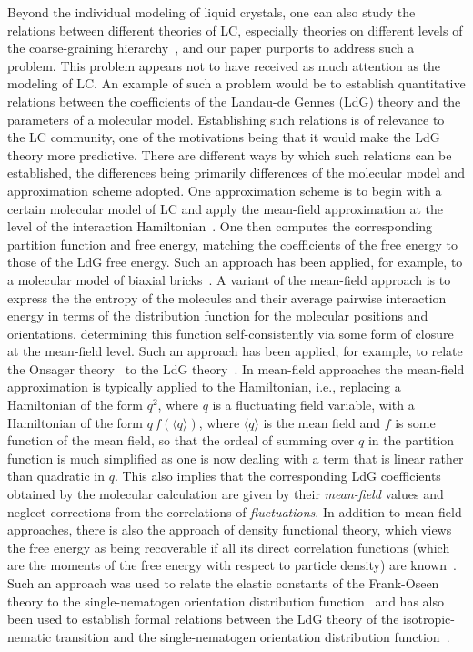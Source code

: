 \documentclass[jcp,aps,twocolumn,showpacs,supergroupedaddress,epsfig,amsmath,amssymb,eqsecnum]{revtex4}
\begin{document}
Beyond the individual modeling of liquid crystals, one can also study the relations between different theories of LC, especially theories on different levels of the coarse-graining hierarchy~\cite{chandrasekhar,han2015,sauerwein-oliveira2016}, and our paper purports to address such a problem. This problem appears not to have received as much attention as the modeling of LC. An example of such a problem would be to establish quantitative relations between the coefficients of the Landau-de Gennes (LdG) theory and the parameters of a molecular model. Establishing such relations is of relevance to the LC community, one of the motivations being that it would make the LdG theory more predictive. There are different ways by which such relations can be established, the differences being primarily differences of the molecular model and approximation scheme adopted. One approximation scheme is to begin with a certain molecular model of LC and apply the mean-field approximation at the level of the interaction Hamiltonian~\cite{chandrasekhar}. One then computes the corresponding partition function and free energy, matching the coefficients of the free energy to those of the LdG free energy. Such an approach has been applied, for example, to a molecular model of biaxial bricks~\cite{sauerwein-oliveira2016}. A variant of the mean-field approach is to express the the entropy of the molecules and their average pairwise interaction energy in terms of the distribution function for the molecular positions and orientations, determining this function self-consistently via some form of closure at the mean-field level. Such an approach has been applied, for example, to relate the Onsager theory~\cite{onsager1949} to the LdG theory~\cite{han2015}. In mean-field approaches the mean-field approximation is typically applied to the Hamiltonian, i.e., replacing a Hamiltonian of the form $q^2$, where $q$ is a fluctuating field variable, with a Hamiltonian of the form $q \, f(\langle q \rangle)$, where $\langle q \rangle$ is the mean field and $f$ is some function of the mean field, so that the ordeal of summing over $q$ in the partition function is much simplified as one is now dealing with a term that is linear rather than quadratic in $q$. This also implies that the corresponding LdG coefficients obtained by the molecular calculation are given by their {\em mean-field} values and neglect corrections from the correlations of {\em fluctuations}. In addition to mean-field approaches, there is also the approach of density functional theory, which views the free energy as being recoverable if all its direct correlation functions (which are the moments of the free energy with respect to particle density) are known~\cite{hansen-mcdonald}.  Such an approach was used to relate the elastic constants of the Frank-Oseen theory to the single-nematogen orientation distribution function~\cite{singh1986a,singh1986b,singh1987} and has also been used to establish formal relations between the LdG theory of the isotropic-nematic transition and the single-nematogen orientation distribution function~\cite{singh1984}. 
\end{document}
